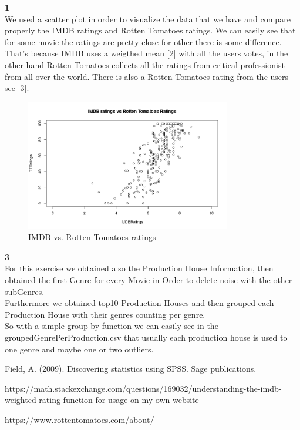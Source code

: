 \documentclass[a4paper]{article}
\begin{document}
	\textbf{1}\\
	We used a scatter plot in order to visualize the data that we have and compare properly the IMDB ratings and Rotten Tomatoes ratings. We can easily see that for some movie the ratings are pretty close for other there is some difference.
	That's because IMDB uses a weigthed mean [2] with all the users votes, in the other hand Rotten Tomatoes collects all the ratings from critical professionist from all over the world. There is also a Rotten Tomatoes rating from the users see [3].
		\begin{figure}[h]
		\begin{center}
		\includegraphics[width=0.8\textwidth]{imdb_vs_rottenR}
		\caption{IMDB vs. Rotten Tomatoes ratings}
		\label{fig:f8}
		\end{center}
		\end{figure}  

	\textbf{3}\\
	For this exercise we obtained also the Production House Information, then obtained the first Genre for every Movie in Order to delete noise with the other subGenres.\\
	Furthermore we obtained top10 Production Houses and then grouped each Production House with their genres counting per genre.\\
	So with a simple group by function we can easily see in the groupedGenrePerProduction.csv that usually each production house is used to one genre and maybe one or two outliers.

\newpage
\begin{thebibliography}{9}
	Field, A. (2009). Discovering statistics using SPSS. Sage publications. 
	
	https://math.stackexchange.com/questions/169032/understanding-the-imdb-weighted-rating-function-for-usage-on-my-own-website
	
	https://www.rottentomatoes.com/about/
\end{thebibliography}
\end{document}
